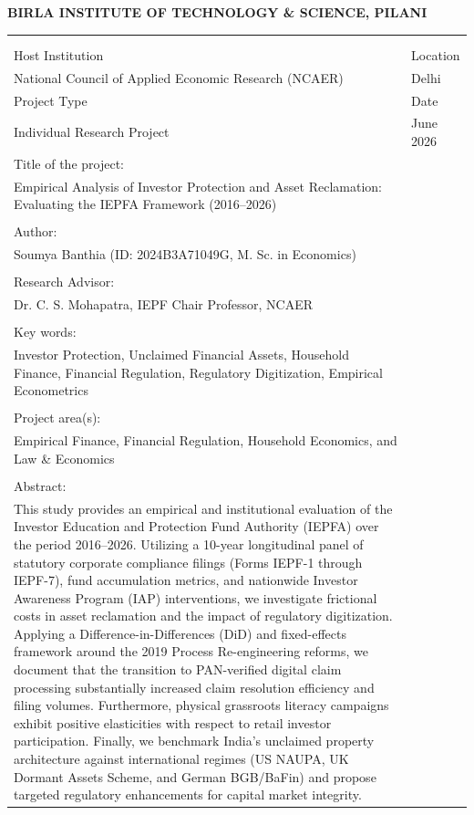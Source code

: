 \documentclass[openany]{book}
\begin{document}
	\centerline{\bf BIRLA INSTITUTE OF TECHNOLOGY \& SCIENCE, PILANI}
	\vspace*{0.5cm}
	{\bf 
		\begin{tabular}{p{6cm}l}
			& \\
			& \\
			Host Institution & \hspace*{3cm} Location \\  National Council of Applied Economic Research (NCAER) & \hspace*{3cm} Delhi
			& \\
			Project Type &\hspace*{3cm} Date \\ Individual Research Project & \hspace*{3cm} June 2026
			& \\
			Title of the project: & \\ \parbox[t]{15 cm} {Empirical Analysis of Investor Protection and Asset Reclamation: Evaluating the IEPFA Framework (2016--2026)} \\
			& \\
			Author: & \\ \parbox[t]{15 cm} {Soumya Banthia (ID: 2024B3A71049G, M. Sc. in Economics)} \\
            & \\
			Research Advisor: & \\ \parbox[t]{15 cm} {Dr. C. S. Mohapatra, IEPF Chair Professor, NCAER} \\
			& \\ 
			Key words: & \\ \parbox[t]{15 cm} {Investor Protection, Unclaimed Financial Assets, Household Finance, Financial Regulation, Regulatory Digitization, Empirical Econometrics} \\
			& \\
			Project area(s):  & \\ \parbox[t]{15 cm} {Empirical Finance, Financial Regulation, Household Economics, and Law \& Economics}\\
			& \\
			Abstract: & \\ \parbox[t]{16 cm} {This study provides an empirical and institutional evaluation of the Investor Education and Protection Fund Authority (IEPFA) over the period 2016--2026. Utilizing a 10-year longitudinal panel of statutory corporate compliance filings (Forms IEPF-1 through IEPF-7), fund accumulation metrics, and nationwide Investor Awareness Program (IAP) interventions, we investigate frictional costs in asset reclamation and the impact of regulatory digitization. Applying a Difference-in-Differences (DiD) and fixed-effects framework around the 2019 Process Re-engineering reforms, we document that the transition to PAN-verified digital claim processing substantially increased claim resolution efficiency and filing volumes. Furthermore, physical grassroots literacy campaigns exhibit positive elasticities with respect to retail investor participation. Finally, we benchmark India's unclaimed property architecture against international regimes (US NAUPA, UK Dormant Assets Scheme, and German BGB/BaFin) and propose targeted regulatory enhancements for capital market integrity.}\\

\end{tabular}}
\end{document}
